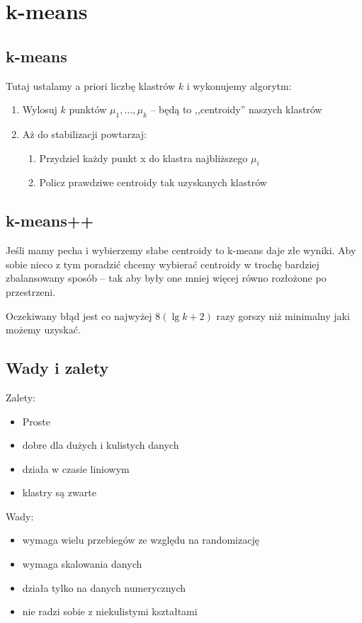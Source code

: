 \section{k-means}

\subsection{k-means}
Tutaj ustalamy a priori liczbę klastrów \( k \) i wykonujemy algorytm:
\begin{enumerate}
	\item Wylosuj \( k \) punktów \( \mu_1, \dots, \mu_k \) -- będą to ,,centroidy''  naszych klastrów
	\item Aż do stabilizacji powtarzaj:
	      \begin{enumerate}
		      \item Przydziel każdy punkt x do klastra najbliższego \( \mu_i \)
		      \item Policz prawdziwe centroidy tak uzyskanych klastrów
	      \end{enumerate}
\end{enumerate}

\subsection{k-means++}

Jeśli mamy pecha i wybierzemy słabe centroidy to k-means daje złe wyniki.
Aby sobie nieco z tym poradzić chcemy wybierać centroidy w trochę bardziej zbalansowany sposób -- tak aby były one mniej więcej równo rozłożone po przestrzeni.

Oczekiwany błąd jest co najwyżej \( 8(\lg k + 2) \) razy gorszy niż minimalny jaki możemy uzyskać.

\subsection{Wady i zalety}

Zalety:
\begin{itemize}
	\item Proste
	\item dobre dla dużych i kulistych danych
	\item działa w czasie liniowym
	\item klastry są zwarte
\end{itemize}

Wady:
\begin{itemize}
	\item wymaga wielu przebiegów ze względu na randomizację
	\item wymaga skalowania danych
	\item działa tylko na danych numerycznych
	\item nie radzi sobie z niekulistymi kształtami
\end{itemize}
